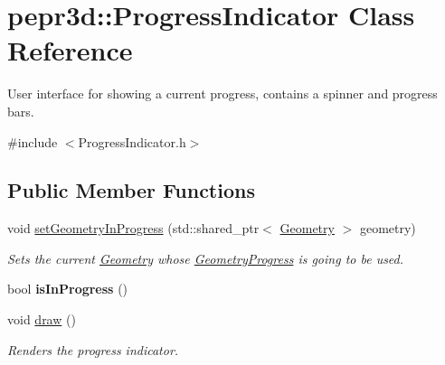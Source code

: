 \hypertarget{classpepr3d_1_1_progress_indicator}{}\section{pepr3d\+::Progress\+Indicator Class Reference}
\label{classpepr3d_1_1_progress_indicator}


User interface for showing a current progress, contains a spinner and progress bars.  




{\ttfamily \#include $<$Progress\+Indicator.\+h$>$}

\subsection*{Public Member Functions}
\begin{DoxyCompactItemize}
\item 
\mbox{\label{classpepr3d_1_1_progress_indicator_ac0931998aeb37b012ca79b418896044b}} 
void \mbox{\hyperlink{classpepr3d_1_1_progress_indicator_ac0931998aeb37b012ca79b418896044b}{set\+Geometry\+In\+Progress}} (std\+::shared\+\_\+ptr$<$ \mbox{\hyperlink{classpepr3d_1_1_geometry}{Geometry}} $>$ geometry)
\begin{DoxyCompactList}\small\item\em Sets the current \mbox{\hyperlink{classpepr3d_1_1_geometry}{Geometry}} whose \mbox{\hyperlink{structpepr3d_1_1_geometry_progress}{Geometry\+Progress}} is going to be used. \end{DoxyCompactList}\item 
\mbox{\label{classpepr3d_1_1_progress_indicator_ab60bafabdc2821c10bdb320e9b859c18}} 
bool {\bfseries is\+In\+Progress} ()
\item 
\mbox{\label{classpepr3d_1_1_progress_indicator_a6b9af9848a2fb8bf39e38b9c9b8fc001}} 
void \mbox{\hyperlink{classpepr3d_1_1_progress_indicator_a6b9af9848a2fb8bf39e38b9c9b8fc001}{draw}} ()
\begin{DoxyCompactList}\small\item\em Renders the progress indicator. \end{DoxyCompactList}\end{DoxyCompactItemize}
